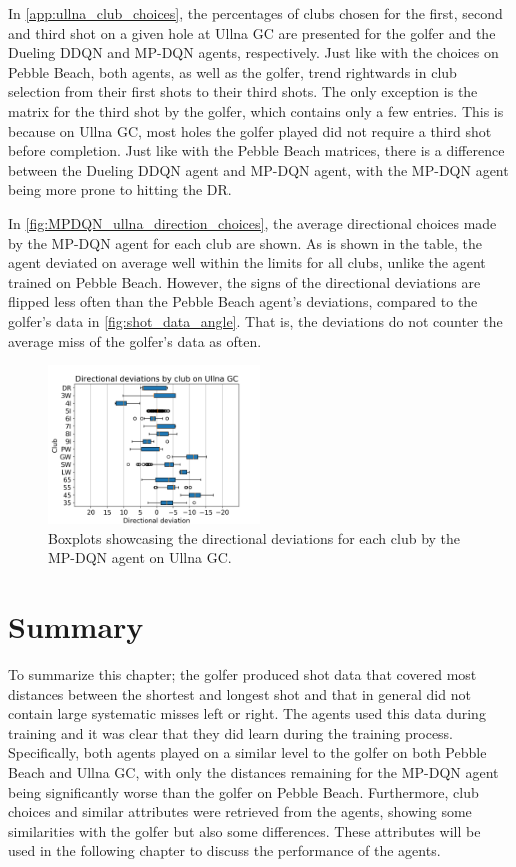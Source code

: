 \documentclass{kththesis}
\begin{document}
In \autoref{app:ullna_club_choices}, the percentages of clubs chosen for the first, second and third shot on a given hole at Ullna GC are presented for the golfer and the Dueling DDQN and MP-DQN agents, respectively. Just like with the choices on Pebble Beach, both agents, as well as the golfer, trend rightwards in club selection from their first shots to their third shots. The only exception is the matrix for the third shot by the golfer, which contains only a few entries. This is because on Ullna GC, most holes the golfer played did not require a third shot before completion. Just like with the Pebble Beach matrices, there is a difference between the Dueling DDQN agent and MP-DQN agent, with the MP-DQN agent being more prone to hitting the DR.

In \autoref{fig:MPDQN_ullna_direction_choices}, the average directional choices made by the MP-DQN agent for each club are shown. As is shown in the table, the agent deviated on average well within the limits for all clubs, unlike the agent trained on Pebble Beach. However, the signs of the directional deviations are flipped less often than the Pebble Beach agent's deviations, compared to the golfer's data in \autoref{fig:shot_data_angle}. That is, the deviations do not counter the average miss of the golfer's data as often.

\begin{figure}
    \centering
    \includegraphics[width=0.5\textwidth]{Boxplots/MPDQN_Ullna_directions.png}
    \caption{Boxplots showcasing the directional deviations for each club by the MP-DQN agent on Ullna GC.}
    \label{fig:MPDQN_ullna_direction_choices}
\end{figure}

\section{Summary}
To summarize this chapter; the golfer produced shot data that covered most distances between the shortest and longest shot and that in general did not contain large systematic misses left or right. The agents used this data during training and it was clear that they did learn during the training process. Specifically, both agents played on a similar level to the golfer on both Pebble Beach and Ullna GC, with only the distances remaining for the MP-DQN agent being significantly worse than the golfer on Pebble Beach. Furthermore, club choices and similar attributes were retrieved from the agents, showing some similarities with the golfer but also some differences. These attributes will be used in the following chapter to discuss the performance of the agents.
\end{document}
